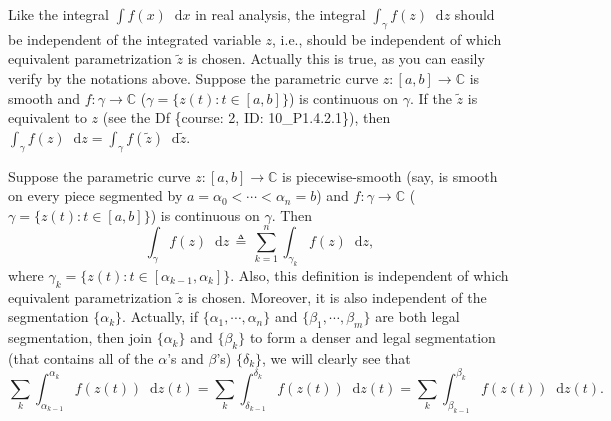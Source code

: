\documentclass{article}
\newcommand{\dif}{\mathop{}\!\mathrm{d}}
\begin{document}
\begin{Rmk}{}
    \begin{compactenum}
        \item Like the integral $\int f(x)\dif x$ in real analysis, the integral $\int_\gamma f(z)\dif z$ should be independent of the integrated variable $z$, i.e., should be independent of which equivalent parametrization $\tilde{z}$ is chosen. Actually this is true, as you can easily verify by the notations above. \textcolor{Th}{Suppose the parametric curve $z: [a,b]\to\mathbb{C}$ is smooth and $f:\gamma\to\mathbb{C}$ ($\gamma = \{z(t): t\in [a,b]\}$) is continuous on $\gamma$. If the $\tilde{z}$ is equivalent to $z$ (see the Df \{course: 2, ID: 10\_P1.4.2.1\}), then $\int_\gamma f(z)\dif z = \int_\gamma f(\tilde{z})\dif\tilde{z}$.}
        \item \textcolor{Df}{Suppose the parametric curve $z: [a,b]\to\mathbb{C}$ is piecewise-smooth (say, is smooth on every piece segmented by $a = \alpha_0 < \cdots < \alpha_n = b$) and $f:\gamma\to\mathbb{C}$ ($\gamma = \{z(t): t\in [a,b]\}$) is continuous on $\gamma$. Then 
        $$ \int_\gamma f(z)\dif z \,\triangleq\, \sum_{k=1}^{n}\int_{\gamma_k} f(z)\dif z, $$
        where $\gamma_k = \{z(t): t\in [\alpha_{k-1}, \alpha_k]\}$}.
        Also, \textcolor{Th}{this definition is independent of which equivalent parametrization $\tilde{z}$ is chosen.} Moreover, \textcolor{Th}{it is also independent of the segmentation $\{\alpha_k\}$.} Actually, if $\{\alpha_1, \cdots, \alpha_n\}$ and $\{\beta_1, \cdots, \beta_m\}$ are both legal segmentation, then join $\{\alpha_k\}$ and $\{\beta_k\}$ to form a denser and legal segmentation (that contains all of the $\alpha$'s and $\beta$'s) $\{\delta_k\}$, we will clearly see that
        $$ \sum_k \int_{\alpha_{k-1}}^{\alpha_k} f(z(t))\dif z(t) = \sum_k \int_{\delta_{k-1}}^{\delta_k} f(z(t))\dif z(t) = \sum_k \int_{\beta_{k-1}}^{\beta_k} f(z(t))\dif z(t). $$
    \end{compactenum}
\end{Rmk}
\end{document}
